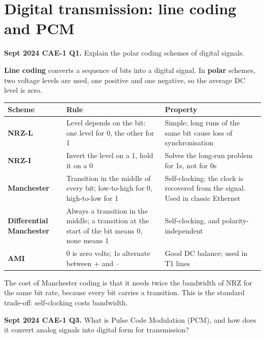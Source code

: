 \documentclass[11pt,a4paper]{article}
\begin{document}
\section{Digital transmission: line coding and PCM}

\begin{pyqbox}
\textbf{Sept 2024 CAE-1 Q1.} Explain the polar coding schemes of digital signals.
\end{pyqbox}

\begin{solbox}
\textbf{Line coding} converts a sequence of bits into a digital signal. In \textbf{polar} schemes, two voltage levels are used, one positive and one negative, so the average DC level is zero.

\begin{center}\small
\begin{tabularx}{\textwidth}{>{\bfseries}p{} p{} X}
\toprule Scheme & Rule & Property\\
\midrule
NRZ-L & Level depends on the bit: one level for 0, the other for 1 & Simple; long runs of the same bit cause loss of synchronisation\\
NRZ-I & Invert the level on a 1, hold it on a 0 & Solves the long-run problem for 1s, not for 0s\\
Manchester & Transition in the middle of every bit; low-to-high for 0, high-to-low for 1 & Self-clocking: the clock is recovered from the signal. Used in classic Ethernet\\
Differential Manchester & Always a transition in the middle; a transition at the start of the bit means 0, none means 1 & Self-clocking, and polarity-independent\\
AMI & 0 is zero volts; 1s alternate between + and -- & Good DC balance; used in T1 lines\\
\bottomrule
\end{tabularx}
\end{center}

The cost of Manchester coding is that it needs twice the bandwidth of NRZ for the same bit rate, because every bit carries a transition. This is the standard trade-off: self-clocking costs bandwidth.
\end{solbox}

\begin{pyqbox}
\textbf{Sept 2024 CAE-1 Q3.} What is Pulse Code Modulation (PCM), and how does it convert analog signals into digital form for transmission?
\end{pyqbox}
\end{document}
